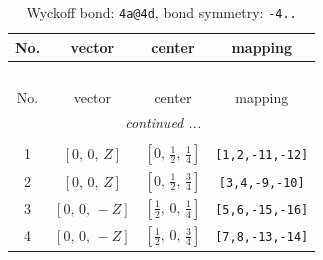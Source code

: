 \documentclass[fleqn,8pt]{jsarticle}
\begin{document}
\begin{longtable}{cccc}
\caption{Wyckoff bond: {\tt 4a@4d}, bond symmetry: {\tt -4..}}
 \\
 \hline \hline
No. & vector & center & mapping \\ \hline \endfirsthead

\multicolumn{3}{l}{\tablename\ \thetable{}} \\
 \hline \hline
No. & vector & center & mapping \\ \hline \endhead

 \hline \hline
\multicolumn{3}{r}{\footnotesize\it continued ...} \\ \endfoot

 \hline \hline
\multicolumn{3}{r}{} \\ \endlastfoot

1 & $\left[ 0,\, 0,\, Z \right]$ & $\left[ 0,\, \frac{1}{2},\, \frac{1}{4} \right]$ & {\tt [1,2,-11,-12]} \\ \hline
2 & $\left[ 0,\, 0,\, Z \right]$ & $\left[ 0,\, \frac{1}{2},\, \frac{3}{4} \right]$ & {\tt [3,4,-9,-10]} \\ \hline
3 & $\left[ 0,\, 0,\, - Z \right]$ & $\left[ \frac{1}{2},\, 0,\, \frac{1}{4} \right]$ & {\tt [5,6,-15,-16]} \\ \hline
4 & $\left[ 0,\, 0,\, - Z \right]$ & $\left[ \frac{1}{2},\, 0,\, \frac{3}{4} \right]$ & {\tt [7,8,-13,-14]} \\
\end{longtable}
\renewcommand{\arraystretch}{1.2}
\end{document}
